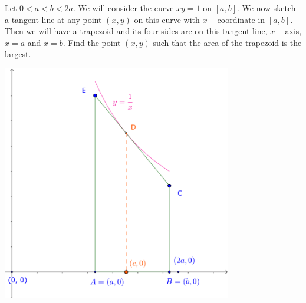 \documentclass{article}
\begin{document}
\newpage

\begin{problem*}[5]
    Let $0 < a < b < 2a.$ We will consider the curve $xy=1$ on $[a,b].$ We now sketch a tangent line at any point $(x,y)$ on this curve with $x-$coordinate in $[a,b].$
    Then we will have a trapezoid and its four sides are on this tangent line, $x-$axis, $x = a$ and $x = b.$
    Find the point $(x, y)$ such that the area of the trapezoid is the largest.
\end{problem*}

\begin{center}
    \includegraphics[width=10cm]{./svg/pdf/derivative-2-5.pdf}
\end{center}
\end{document}
